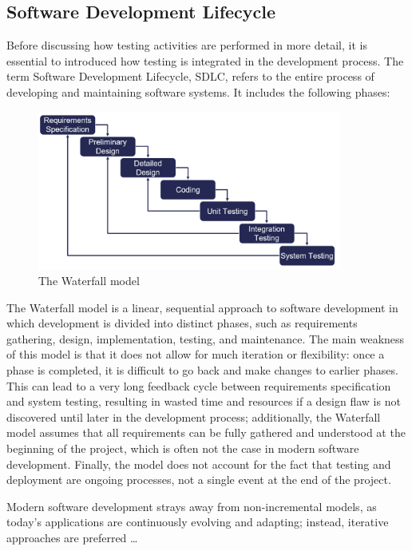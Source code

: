 \subsection{Software Development Lifecycle}
Before discussing how testing activities are performed in more detail, it is essential to introduced how testing is integrated in the development process. The term Software Development Lifecycle, SDLC, refers to the entire process of developing and maintaining software systems. It includes the following phases:


\begin{figure}[H]
    \centering
    \includegraphics[width=10cm, scale=0.5]{figures/waterfall_model.png}
    \caption{The Waterfall model}
    \label{waterfall_model}
\end{figure}

The Waterfall model is a linear, sequential approach to software development in which development is divided into distinct phases, such as requirements gathering, design, implementation, testing, and maintenance.
The main weakness of this model is that it does not allow for much iteration or flexibility: once a phase is completed, it is difficult to go back and make changes to earlier phases. This can lead to a very long feedback cycle between requirements specification and system testing, resulting in wasted time and resources if a design flaw is not discovered until later in the development process; additionally, the Waterfall model assumes that all requirements can be fully gathered and understood at the beginning of the project, which is often not the case in modern software development. Finally, the model does not account for the fact that testing and deployment are ongoing processes, not a single event at the end of the project.


Modern software development strays away from non-incremental models, as today's applications are continuously evolving and adapting; instead, iterative approaches are preferred \dots

